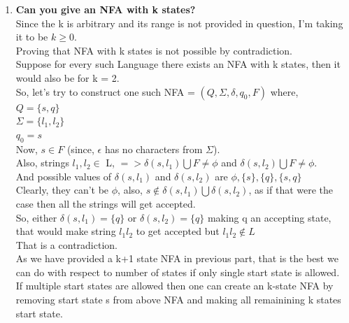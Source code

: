 \documentclass{article}
\begin{document}
\begin{enumerate}
\item \textbf{Can you give an NFA with k states?}\\

Since the k is arbitrary and its range is not provided in question, I'm taking it to be $k \geq 0$.\\
Proving that NFA with k states is not possible by contradiction.\\
Suppose for every such Language there exists an NFA with k states, then it would also be for k = 2.\\
So, let's try to construct one such NFA = {$(Q, \Sigma, \delta, q_0 , F )$} where,\\
$Q = \{s, q\}$\\
$\Sigma = \{l_1, l_2 \}$\\
$q_0 = s$\\
Now, $s \in F$ (since, $\epsilon $ has no characters from $\Sigma $).\\
Also, strings $l_1, l_2 \in $ L, $=> \delta(s,l_1) \bigcup F \neq \phi $ and $ \delta(s,l_2)  \bigcup F \neq \phi$.\\
And possible values of $ \delta(s,l_1) $ and $ \delta(s,l_2)$ are $\phi, \{s\}, \{q\}, \{s,q\}$\\
Clearly, they can't be $\phi$, also, $s \notin \delta(s,l_1) \bigcup \delta(s,l_2) $, as if that were the case then all the 
strings will get accepted. \\
So, either $ \delta(s,l_1) = \{q\}$ or $ \delta(s,l_2) = \{q\}$ making q an accepting state, that would make string $l_1l_2$ to get accepted 
but $l_1l_2 \notin L$\\
That is a contradiction.\\

As we have provided a k+1 state NFA in previous part, that is the best we can do with respect to number of states if only single start state is allowed. \\
If multiple start states are allowed then one can create an k-state NFA by removing start state s from above NFA and making all remainining k states 
start state.

\end{enumerate}

\pagebreak
\end{document}
